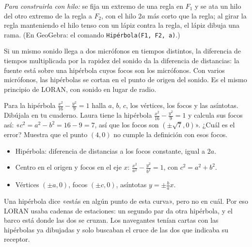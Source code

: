 \documentclass[11pt]{article}
\begin{document}
\emph{Para construirla con hilo:} se fija un extremo de una regla en $F_1$ y se
ata un hilo del otro extremo de la regla a $F_2$, con el hilo $2a$ más corto que la
regla; al girar la regla manteniendo el hilo tenso con un lápiz contra la regla, el
lápiz dibuja una rama. (En GeoGebra: el comando \texttt{Hipérbola(F1, F2, a)}.)

\begin{aplicacion}
Si un mismo sonido llega a dos micrófonos en tiempos distintos, la diferencia de
tiempos multiplicada por la rapidez del sonido da la diferencia de distancias: la
fuente está sobre una hipérbola cuyos focos son los micrófonos. Con varios
micrófonos, las hipérbolas se cortan en el punto de origen del sonido. Es el mismo
principio de LORAN, con sonido en lugar de radio.
\end{aplicacion}

\begin{preguntas}
\pregunta Para la hipérbola $\frac{x^2}{16} - \frac{y^2}{9} = 1$ halla $a$, $b$, $c$,
los vértices, los focos y las asíntotas. Dibújala en tu cuaderno.
\espacio{4cm}
\pregunta Laura tiene la hipérbola $\frac{x^2}{16} - \frac{y^2}{9} = 1$ y calcula sus
focos así: «$c^2 = a^2 - b^2 = 16 - 9 = 7$, así que los focos son
$(\pm\sqrt{7}, 0)$». ¿Cuál es el error? Muestra que el punto $(4, 0)$ no cumple la
definición con esos focos.
\espacio{3.5cm}
\end{preguntas}

\begin{resumen}
\begin{itemize}
  \item Hipérbola: diferencia de distancias a los focos constante, igual a $2a$.
  \item Centro en el origen y focos en el eje $x$: $\frac{x^2}{a^2} - \frac{y^2}{b^2} = 1$, con $c^2 = a^2 + b^2$.
  \item Vértices $(\pm a, 0)$, focos $(\pm c, 0)$, asíntotas $y = \pm \frac{b}{a}x$.
\end{itemize}
\end{resumen}

\label{tema:navegacion}

\begin{hilo}
Una hipérbola dice «estás en algún punto de esta curva», pero no en cuál. Por eso
LORAN usaba cadenas de estaciones: un segundo par da otra hipérbola, y el barco está
donde las dos se cruzan. Los navegantes tenían cartas con las hipérbolas ya
dibujadas y solo buscaban el cruce de las dos que indicaba su receptor.
\end{hilo}
\end{document}
